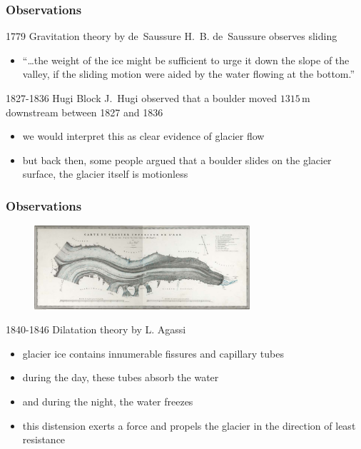 \documentclass[hide notes,intlimits]{beamer}
\begin{document}
\begin{frame}
  \frametitle{Observations}
    \begin{block}{1779 Gravitation theory by de~Saussure}
      H.~B. de~Saussure observes sliding
      \begin{itemize}
        \item ``\ldots the weight of the ice might be sufficient to urge it down the slope of the valley, if the sliding motion were aided by the water flowing at the bottom.''
      \end{itemize}
    \end{block}
    \begin{block}{1827-1836 Hugi Block}
      J.~Hugi observed that a boulder moved $1315\,\text{m}$ downstream between 1827 and 1836
      \begin{itemize}
        \item we would interpret this as clear evidence of glacier flow
        \item but back then, some people argued that a boulder slides on the glacier surface, the glacier itself is motionless
      \end{itemize}
    \end{block}
\end{frame}

\begin{frame}
  \frametitle{Observations}
  \begin{figure}
    \includegraphics[width=8cm]{figures/agassi}%
  \end{figure}
    \begin{block}{1840-1846 Dilatation theory by L. Agassi}
      \begin{itemize}
        \item glacier ice contains innumerable fissures and capillary tubes
        \item during the day, these tubes absorb the water
        \item and during the night, the water freezes
        \item this distension exerts a force and propels the glacier in the direction of least resistance
      \end{itemize}
    \end{block}
\end{frame}
\end{document}
